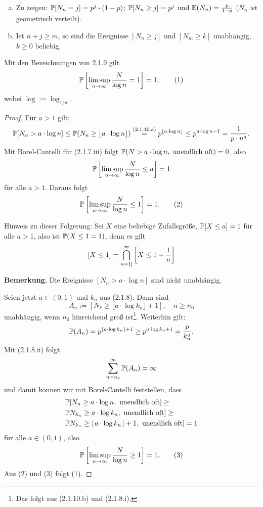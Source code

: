 \begin{prgp}[Aufgabe]
  \begin{enumerate}[(a)]
  \item Zu zeigen: $\mathbb{P}[N_n = j] = p^j \cdot (1-p)$; $\mathbb{P}[N_n \ge j] = p^j$ und
    $\mathbb{E}(N_n) = \frac{p}{1-p}$ ($N_n$ ist geometrisch verteilt).
  \item Ist $n+j \ge m$, so sind die Ereignisse $[N_n \ge j]$ und $[N_m \ge
    k]$ unabhängig, $k \ge 0$ beliebig.
  \end{enumerate}
\end{prgp}

\begin{thm}
  Mit den Bezeichnungen von 2.1.9 gilt
  \[ \mathbb{P} \left[ \limsup_{n \to \infty} \frac{N}{\log n} = 1  \right] = 1,
    \tag{1} \]
  wobei $\log := \log_{1/p}$.
\end{thm}

\begin{proof}
  Für $a > 1$ gilt:
  \[ \mathbb{P} [N_n > a \cdot \log n] \le \mathbb{P}( N_n \ge \lfloor a \cdot \log n
    \rfloor) \overset{\text{(2.1.10.a)}}{=} p^{\lfloor a \cdot \log n \rfloor} \le p^{a
      \cdot \log n - 1} = \frac{1}{p \cdot n^a}. \]
  Mit Borel-Cantelli für (2.1.7.iii) folgt $\mathbb{P}( N > a \cdot \log n, \text{
    unendlich oft}) = 0$, also 
  \[ \mathbb{P} \left[  \limsup_{n \to \infty} \frac{N}{\log n} \le a \right] = 1 \]
  für alle $a > 1$. Daraus folgt
  \[ \mathbb{P} \left[ \limsup_{n \to \infty} \frac{N}{\log n} \le 1 \right] = 1.
    \tag{2} \]

  Hinweis zu dieser Folgerung: Sei $X$ eine beliebige Zufallsgröße, $\mathbb{P} [X \le
  a] = 1$ für alle $a > 1$, also ist $\mathbb{P}( X \le 1 = 1)$, denn es gilt
  \[ [ X \le 1 ] = \bigcap_{n=1]}^\infty \left[ X \le 1 + \frac{1}{n} \right] \]

  \textbf{Bemerkung.} Die Ereignisse $[N_n > a \cdot \log n]$ sind nicht
  unabhängig.

  Seien jetzt $a \in (0,1)$ und $k_n$ aus (2.1.8). Dann sind
  \[ A_n := [ N_k \ge \lfloor a \cdot \log k_n \rfloor + 1 ], \quad n \ge n_0 \]
  unabhängig, wenn $n_0$ hinreichend groß ist\footnote{%
    Das folgt aus (2.1.10.b) und (2.1.8.i).}.
  Weiterhin gilt:
  \[ \mathbb{P}(A_n) = p^{\lfloor a \cdot \log k_n \rfloor + 1} \ge p^{a \cdot \log k_n
      + 1} = \frac{p}{k_n^a}. \]
  Mit (2.1.8.ii) folgt
  \[ \sum_{n=n_0}^\infty \mathbb{P}(A_n) = \infty \]
  und damit können wir mit Borel-Cantelli feststellen, dass
  \[ \begin{aligned}
      &\mathbb{P} [ N_n \ge a \cdot \log n, \text{ unendlich oft}] \ge \\
      &\mathbb{P} N_{k_n} \ge a \cdot \log k_n, \text{ unendlich oft}] \ge \\
      &\mathbb{P} N_{k_n} \ge \lfloor a \cdot \log k_n \rfloor + 1 , \text{ unendlich
        oft}] = 1
    \end{aligned} \]
  für alle $a \in (0,1)$, also
  \[ \mathbb{P} \left[ \limsup_{n \to \infty} \frac{N}{\log n} \ge 1 \right] = 1.
    \tag{3} \]
  Aus (2) und (3) folgt (1).
\end{proof}

